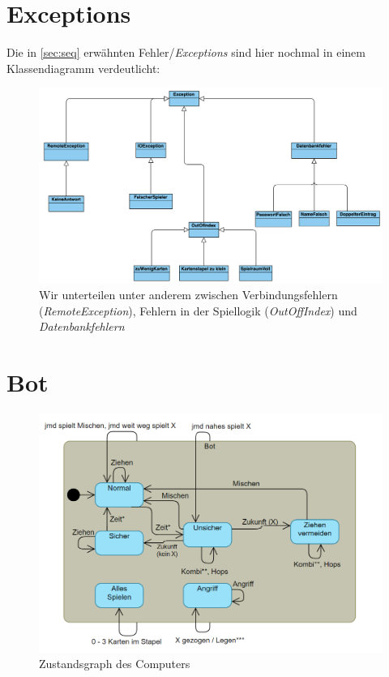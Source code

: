 \documentclass[11pt, a4paper, oneside]{memoir}                                                      %
\begin{document}
    \clearpage

    \section{Exceptions} \label{exc}
        Die in \ref{sec:seq} erwähnten Fehler/\textit{Exceptions} sind hier nochmal in einem Klassendiagramm verdeutlicht:
        \begin{figure}[h]
			\centering
			\includegraphics[scale=0.4]{../img/Exceptions.png}
            \caption{Wir unterteilen unter anderem zwischen Verbindungsfehlern (\textit{RemoteException}), Fehlern in der Spiellogik (\textit{OutOffIndex}) und \textit{Datenbankfehlern}}
        \end{figure} 
    \clearpage

    \section{Bot}

        \begin{figure}[h]
            \centering
            \includegraphics[scale=0.5]{../img/bot.png}
            \caption{Zustandsgraph des Computers}
            \label{fig:bot}
        \end{figure}
\end{document}
